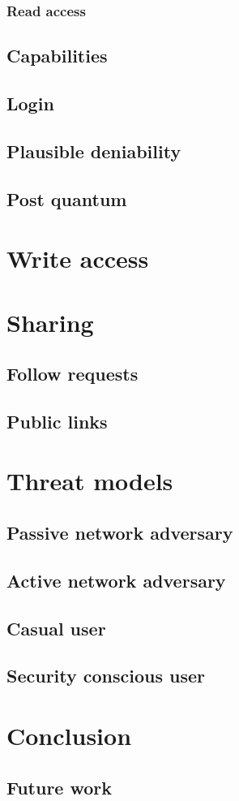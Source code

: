 \documentclass[12pt]{article}
\begin{document}
\subsubsection*{Read access}

\subsection*{Capabilities}

\subsection*{Login}

\subsection*{Plausible deniability}

\subsection*{Post quantum}

\section*{Write access}

\section*{Sharing}

\subsection*{Follow requests}

\subsection*{Public links}

\section*{Threat models}

\subsection*{Passive network adversary}
\subsection*{Active network adversary}
\subsection*{Casual user}
\subsection*{Security conscious user}%

\section*{Conclusion}

\subsection*{Future work}
\end{document}
